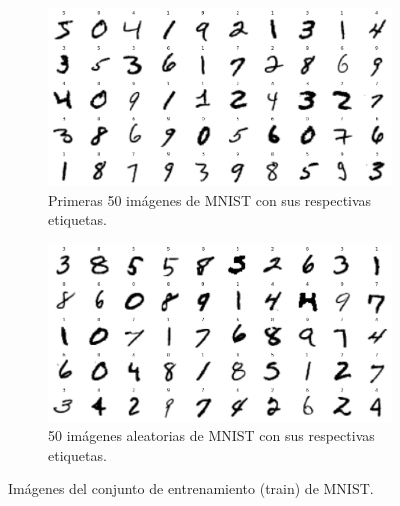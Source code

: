 \begin{figure}[h!]
    \centering
    \begin{subfigure}[b]{0.45\textwidth}
        \centering
        \includegraphics[width=\textwidth]{images/mnist/mnist_train_first50.png}
        \caption{Primeras 50 imágenes de MNIST con sus respectivas etiquetas.}
        \label{mnist3}
    \end{subfigure}
    \hspace{1cm}
    \begin{subfigure}[b]{0.45\textwidth}
        \centering
        \includegraphics[width=\textwidth]{images/mnist/mnist_train_random.png}
        \caption{50 imágenes aleatorias de MNIST con sus respectivas etiquetas.}
        \label{mnist4}
    \end{subfigure}
    \caption{Imágenes del conjunto de entrenamiento (train) de MNIST.}
    \label{mnist_}
\end{figure}


